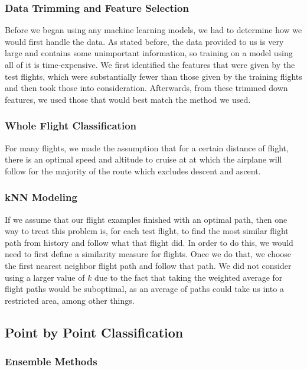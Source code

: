 \documentclass{article}[12pt]
\begin{document}
\begin{multicols}{2}
\subsubsection{Data Trimming and Feature Selection}

Before we began using any machine learning models, we had to determine how we would first handle the data. As stated before, the data provided to us is very large and contains some unimportant information, so training on a model using all of it is time-expensive. We first identified the features that were given by the test flights, which were substantially fewer than those given by the training flights and then took those into consideration. Afterwards, from these trimmed down features, we used those that would best match the method we used. 


\subsubsection{Whole Flight Classification}
For many flights, we made the assumption that for a certain distance of flight, there is an optimal speed and altitude to cruise at at which the airplane will follow for the majority of the route which excludes descent and ascent. 
\subsubsection{kNN Modeling}

If we assume that our flight examples finished with an optimal path, then one way to treat this problem is, for each test flight, to find the most similar flight path from history and follow what that flight did. In order to do this, we would need to first define a similarity measure for flights. Once we do that, we choose the first nearest neighbor flight path and follow that path. We did not consider using a larger value of $k$ due to the fact that taking the weighted average for flight paths would be suboptimal, as an average of paths could take us into a restricted area, among other things.


\subsection{Point by Point Classification}




\subsubsection{Ensemble Methods}

\end{multicols}
\end{document}
